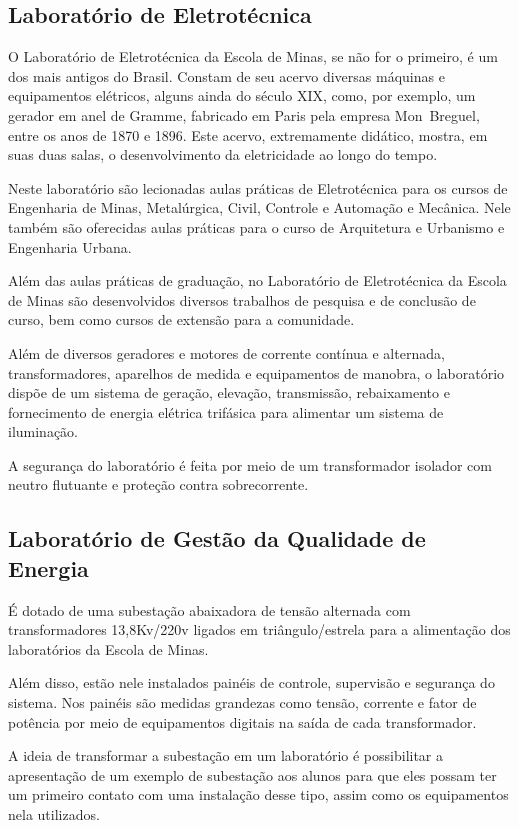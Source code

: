 \documentclass[
	12pt,				%
	openright,			%
	oneside,			%
	a4paper,			%
	english,			%
	brazil				%
	]{abntex2}
\begin{document}
\subsection*{Laboratório de Eletrotécnica}

O Laboratório de Eletrotécnica da Escola de Minas, se não for o primeiro, é um dos mais antigos do Brasil. Constam de seu acervo diversas máquinas e equipamentos elétricos, alguns ainda do século XIX, como, por exemplo, um gerador em anel de Gramme, fabricado em Paris pela empresa Mon~Breguel, entre os anos de 1870 e 1896. Este acervo, extremamente didático, mostra, em suas duas salas, o desenvolvimento da eletricidade ao longo do tempo.

Neste laboratório são lecionadas aulas práticas de Eletrotécnica para os cursos de Engenharia de Minas, Metalúrgica, Civil, Controle e Automação e Mecânica. Nele também são oferecidas aulas práticas para o curso de Arquitetura e Urbanismo e Engenharia Urbana.

Além das aulas práticas de graduação, no Laboratório de Eletrotécnica da Escola de Minas são desenvolvidos diversos trabalhos de pesquisa e de conclusão de curso, bem como cursos de extensão para a comunidade.

Além de diversos geradores e motores de corrente contínua e alternada, transformadores, aparelhos de medida e equipamentos de manobra, o laboratório dispõe de um sistema de geração, elevação, transmissão, rebaixamento e fornecimento de energia elétrica trifásica para alimentar um sistema de iluminação.

A segurança do laboratório é feita por meio de um transformador isolador com neutro flutuante e proteção contra sobrecorrente.

\subsection*{Laboratório de Gestão da Qualidade de Energia}

É dotado de uma subestação abaixadora de tensão alternada com transformadores 13,8Kv/220v ligados em triângulo/estrela para a alimentação dos laboratórios da Escola de Minas.

Além disso, estão nele instalados painéis de controle, supervisão e segurança do sistema. Nos painéis são medidas grandezas como tensão, corrente e fator de potência por meio de equipamentos digitais na saída de cada transformador.

A ideia de transformar a subestação em um laboratório é possibilitar a apresentação de um exemplo de subestação aos alunos para que eles possam ter um primeiro contato com uma instalação desse tipo, assim como os equipamentos nela utilizados.
\end{document}
